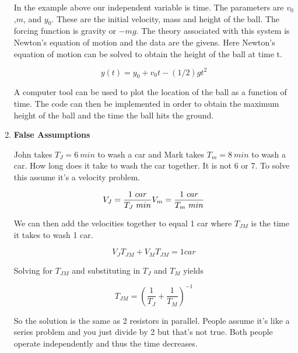 \begin{enumerate}
    In the example above our independent variable is time. The
    parameters are $v_0$,$m$, and $y_0$. These are the initial
    velocity, mass and height of the ball. The forcing function is
    gravity or $-mg$. The theory associated with this system is
    Newton's equation of motion and the data are the givens. Here
    Newton's equation of motion can be solved to obtain the height of
    the ball at time t.

    \begin{equation}
      y(t) = y_0 + v_0t - (1/2)gt^2
    \end{equation}

    A computer tool can be used to plot the location of the ball as a
    function of time. The code can then be implemented in order to
    obtain the maximum height of the ball and the time the ball hits
    the ground.

  \item {\bf False Assumptions}

    John takes $T_J=6~min$ to wash a car and Mark takes $T_m=8~min$ to
    wash a car. How long does it take to wash the car together. It is
    not 6 or 7. To solve this assume it's a velocity problem. 

    \begin{equation}
      V_J = \frac{1~car}{T_J~min}\\
      V_m = \frac{1~car}{T_m~min}\\
    \end{equation}

    We can then add the velocities together to equal 1 car where
    $T_{JM}$ is the time it takes to wash 1 car.

    \begin{equation}
      V_JT_{JM}+V_MT_{JM} = 1 car
    \end{equation}

    Solving for $T_{JM}$ and substituting in $T_J$ and $T_M$ yields
    
    \begin{equation}
      T_{JM} = (\frac{1}{T_J} + \frac{1}{T_M})^{-1}
    \end{equation}

    So the solution is the same as 2 resistors in parallel. People
    assume it's like a series problem and you just divide by 2 but
    that's not true. Both people operate independently and thus the
    time decreases.

\end{enumerate}
